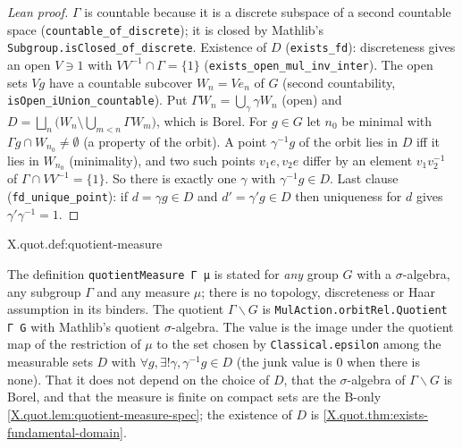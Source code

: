 \begin{proof}[Lean proof]
$\Gamma$ is countable because it is a discrete subspace of a second countable space (\texttt{countable\_of\_discrete}); it is closed by Mathlib's \texttt{Subgroup.isClosed\_of\_discrete}. Existence of $D$ (\texttt{exists\_fd}): discreteness gives an open $V\ni1$ with $V V^{-1}\cap\Gamma=\{1\}$ (\texttt{exists\_open\_mul\_inv\_inter}). The open sets $Vg$ have a countable subcover $W_n=Ve_n$ of $G$ (second countability, \texttt{isOpen\_iUnion\_countable}). Put $\Gamma W_n=\bigcup_\gamma\gamma W_n$ (open) and $D=\bigsqcup_n\bigl(W_n\setminus\bigcup_{m<n}\Gamma W_m\bigr)$, which is Borel. For $g\in G$ let $n_0$ be minimal with $\Gamma g\cap W_{n_0}\neq\emptyset$ (a property of the orbit). A point $\gamma^{-1}g$ of the orbit lies in $D$ iff it lies in $W_{n_0}$ (minimality), and two such points $v_1e,v_2e$ differ by an element $v_1v_2^{-1}$ of $\Gamma\cap VV^{-1}=\{1\}$. So there is exactly one $\gamma$ with $\gamma^{-1}g\in D$. Last clause (\texttt{fd\_unique\_point}): if $d=\gamma g\in D$ and $d'=\gamma'g\in D$ then uniqueness for $d$ gives $\gamma'\gamma^{-1}=1$.
\end{proof}

\begin{definition}
\end{definition}
\begin{tfformal}{X.quot.def:quotient-measure}
\begin{tffidelity}
The definition \texttt{quotientMeasure Γ μ} is stated for \emph{any} group $G$ with a $\sigma$-algebra, any subgroup $\Gamma$ and any measure $\mu$; there is no topology, discreteness or Haar assumption in its binders. The quotient $\Gamma\backslash G$ is \texttt{MulAction.orbitRel.Quotient Γ G} with Mathlib's quotient $\sigma$-algebra. The value is the image under the quotient map of the restriction of $\mu$ to the set chosen by \texttt{Classical.epsilon} among the measurable sets $D$ with $\forall g,\exists!\gamma,\gamma^{-1}g\in D$ (the junk value is $0$ when there is none). That it does not depend on the choice of $D$, that the $\sigma$-algebra of $\Gamma\backslash G$ is Borel, and that the measure is finite on compact sets are the B-only \cref{X.quot.lem:quotient-measure-spec}; the existence of $D$ is \cref{X.quot.thm:exists-fundamental-domain}.
\end{tffidelity}
\end{tfformal}

